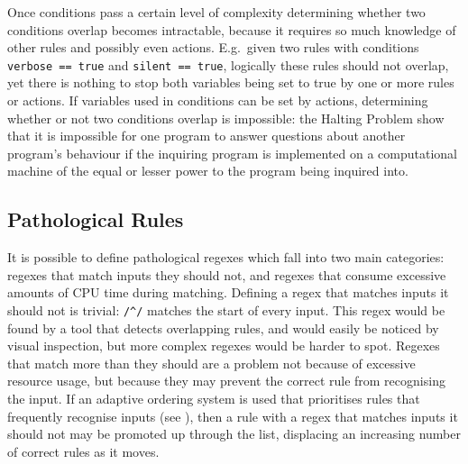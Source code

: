 Once conditions pass a certain level of complexity determining whether two
conditions overlap becomes intractable, because it requires so much
knowledge of other rules and possibly even actions.  E.g.\ given two rules
with conditions \verb!verbose == true! and \verb!silent == true!, logically
these rules should not overlap, yet there is nothing to stop both variables
being set to true by one or more rules or actions.  If variables used in
conditions can be set by actions, determining whether or not two conditions
overlap is impossible: the Halting Problem show that it is impossible for
one program to answer questions about another program's behaviour if the
inquiring program is implemented on a computational machine of the equal or
lesser power to the program being inquired into.

\subsection{Pathological Rules}

It is possible to define pathological regexes which fall into two main
categories: regexes that match inputs they should not, and regexes that
consume excessive amounts of CPU time during matching.  Defining a regex
that matches inputs it should not is trivial: \verb!/^/! matches the start
of every input.  This regex would be found by a tool that detects
overlapping rules, and would easily be noticed by visual inspection, but
more complex regexes would be harder to spot.  Regexes that match more than
they should are a problem not because of excessive resource usage, but
because they may prevent the correct rule from recognising the input.  If
an adaptive ordering system is used that prioritises rules that frequently
recognise inputs (see ), then a
rule with a regex that matches inputs it should not may be promoted up
through the list, displacing an increasing number of correct rules as it
moves.

